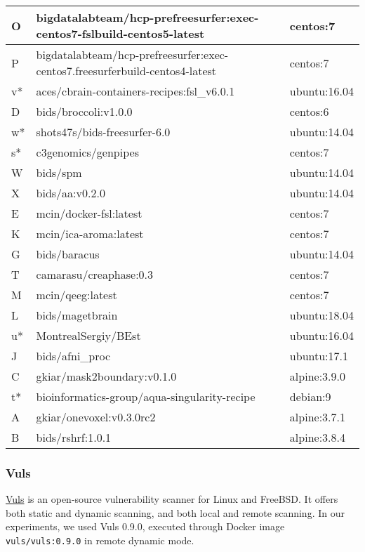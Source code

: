 \begin{center}
\begin{longtable} {| p{} | p{} | p{} |}
\hline
	O   &  bigdatalabteam/hcp-prefreesurfer:exec-centos7-fslbuild-centos5-latest  &  centos:7 \\	
\hline
	P   &  bigdatalabteam/hcp-prefreesurfer:exec-centos7.freesurferbuild-centos4-latest  &  centos:7	\\
\hline
	v*   &  aces/cbrain-containers-recipes:fsl\_v6.0.1  &  ubuntu:16.04	\\
\hline
	D   &  bids/broccoli:v1.0.0  &  centos:6	\\
\hline
	w*   &  shots47s/bids-freesurfer-6.0  &  ubuntu:14.04	\\
\hline
	s*   &  c3genomics/genpipes  &  centos:7	\\
\hline
	W   &  bids/spm  &  ubuntu:14.04	\\
\hline
	X   &  bids/aa:v0.2.0  &  ubuntu:14.04	\\
\hline
	E   &  mcin/docker-fsl:latest  &  centos:7 \\	
\hline
	K   &  mcin/ica-aroma:latest  &  centos:7 \\	
\hline
	G   &  bids/baracus  &  ubuntu:14.04	\\
\hline
	T   &  camarasu/creaphase:0.3  &  centos:7 \\	
\hline
	M   &  mcin/qeeg:latest  &  centos:7	\\
\hline
	L   &  bids/magetbrain  &  ubuntu:18.04	\\
\hline
	u*   &  MontrealSergiy/BEst  &  ubuntu:16.04 \\	
\hline
	J   &  bids/afni\_proc  &  ubuntu:17.1	\\
\hline
	C   &  gkiar/mask2boundary:v0.1.0  &  alpine:3.9.0	\\
\hline
	t*   &  bioinformatics-group/aqua-singularity-recipe  &  debian:9	\\
\hline
	A   &  gkiar/onevoxel:v0.3.0rc2  &  alpine:3.7.1	\\
\hline
	B   &  bids/rshrf:1.0.1  &  alpine:3.8.4	\\
 \hline
\end{longtable}
\label{tab:images}
\end{center}
\subsubsection{Vuls}

\href{https://github.com/future-architect/vuls}{Vuls} is an open-source vulnerability scanner for Linux and FreeBSD. It
offers both static and dynamic scanning, and both local and remote
scanning. In our experiments, we used Vuls 0.9.0, executed through Docker image
\texttt{vuls/vuls:0.9.0} in remote dynamic mode.

